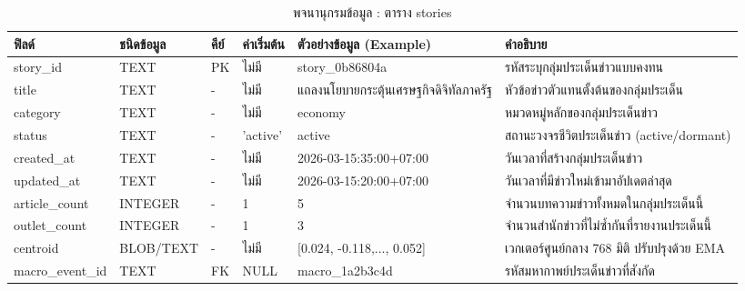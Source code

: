 \begin{table}[H]
\centering
\caption{พจนานุกรมข้อมูล : ตาราง stories}
\label{tab_schema_stories}
\begin{tabularx}{\textwidth}{|L{2.5cm}|C{1.6cm}|C{0.8cm}|C{1.6cm}|L{3.1cm}|Y|}
\hline
\textbf{ฟิลด์} & \textbf{ชนิดข้อมูล} & \textbf{คีย์} & \textbf{ค่าเริ่มต้น} & \textbf{ตัวอย่างข้อมูล (Example)} & \textbf{คำอธิบาย} \\
\hline
story\_\allowbreak id & TEXT & PK & ไม่มี & story\_\allowbreak 0b86804a & รหัสระบุกลุ่มประเด็นข่าวแบบคงทน \\ \hline
title & TEXT & - & ไม่มี & แถลงนโยบายกระตุ้น\newline เศรษฐกิจดิจิทัลภาครัฐ & หัวข้อข่าวตัวแทนตั้งต้นของกลุ่มประเด็น \\ \hline
category & TEXT & - & ไม่มี & economy & หมวดหมู่หลักของกลุ่มประเด็นข่าว \\ \hline
status & TEXT & - & 'active' & active & สถานะวงจรชีวิตประเด็นข่าว (active/dormant) \\ \hline
created\_\allowbreak at & TEXT & - & ไม่มี & 2026-03-15:35:00+07:00 & วันเวลาที่สร้างกลุ่มประเด็นข่าว \\ \hline
updated\_\allowbreak at & TEXT & - & ไม่มี & 2026-03-15:20:00+07:00 & วันเวลาที่มีข่าวใหม่เข้ามาอัปเดตล่าสุด \\ \hline
article\_\allowbreak count & INTEGER & - & 1 & 5 & จำนวนบทความข่าวทั้งหมดในกลุ่มประเด็นนี้ \\ \hline
outlet\_\allowbreak count & INTEGER & - & 1 & 3 & จำนวนสำนักข่าวที่ไม่ซ้ำกันที่รายงานประเด็นนี้ \\ \hline
centroid & BLOB/TEXT & - & ไม่มี & [0.024, -0.118,\newline ..., 0.052] & เวกเตอร์ศูนย์กลาง 768 มิติ ปรับปรุงด้วย EMA \\ \hline
macro\_\allowbreak event\_\allowbreak id & TEXT & FK & NULL & macro\_\allowbreak 1a2b3c4d & รหัสมหากาพย์ประเด็นข่าวที่สังกัด \\
\hline
\end{tabularx}
\end{table}

